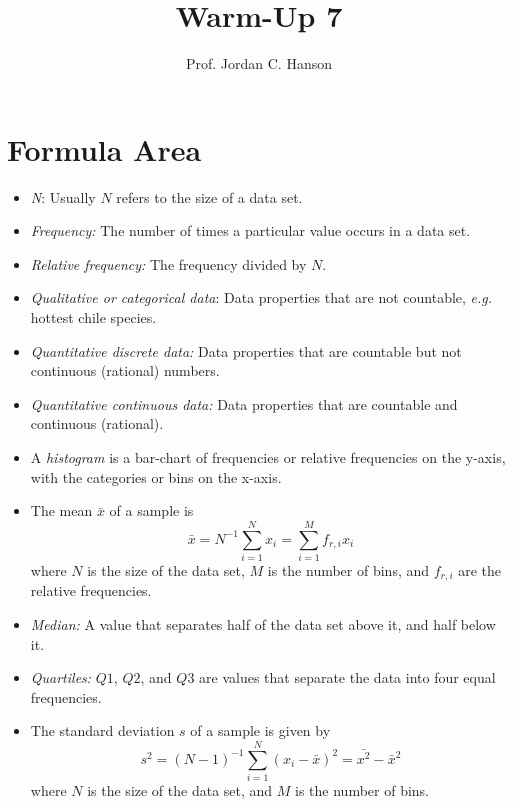 \documentclass{article}
\begin{document}
\title{Warm-Up 7}
\author{Prof. Jordan C. Hanson}

\maketitle

\section{Formula Area}

\begin{itemize}
\item \textit{N}: Usually $N$ refers to the size of a data set.
\item \textit{Frequency:} The number of times a particular value occurs in a data set.
\item \textit{Relative frequency:} The frequency divided by $N$.
\item \textit{Qualitative or categorical data}: Data properties that are not countable, \textit{e.g.} hottest chile species.
\item \textit{Quantitative discrete data:} Data properties that are countable but not continuous (rational) numbers.
\item \textit{Quantitative continuous data:} Data properties that are countable and continuous (rational).
\item A \textit{histogram} is a bar-chart of frequencies or relative frequencies on the y-axis, with the categories or bins on the x-axis.
\item The mean $\bar{x}$ of a sample is 
\begin{equation}
\bar{x} = N^{-1} \sum_{i=1}^N x_i = \sum_{i=1}^M f_{r,i} x_i
\end{equation}
where $N$ is the size of the data set, $M$ is the number of bins, and $f_{r,i}$ are the relative frequencies.
\item \textit{Median:} A value that separates half of the data set above it, and half below it.
\item \textit{Quartiles:} $Q1$, $Q2$, and $Q3$ are values that separate the data into four equal frequencies.
\item The standard deviation $s$ of a sample is given by
\begin{equation}
s^2 = (N-1)^{-1} \sum_{i=1}^N (x_i-\bar{x})^2 = \bar{x^2} - \bar{x}^2
\end{equation}
where $N$ is the size of the data set, and $M$ is the number of bins.
\end{itemize}
\end{document}
